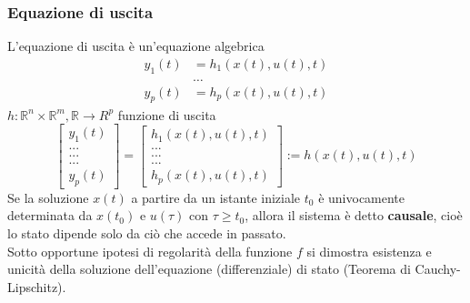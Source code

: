 \documentclass{article}
\numberwithin{equation}{subsection}
\begin{document}
\subsubsection{Equazione di uscita}
L'equazione di uscita è un'equazione algebrica
\begin{align*}
    y_1(t) &= h_1 \left(x(t), u(t), t\right)\\
    &\dots\\
    y_p (t) &= h_p \left(x(t), u(t), t\right)
\end{align*}
$h : \mathbb{R}^n \times \mathbb{R}^m , \mathbb{R} \rightarrow R^p$ funzione di uscita
\begin{equation}
    \begin{bmatrix}
        y_1(t)\\
        ...\\
        ...\\
        ...\\
        y_p(t)
    \end{bmatrix} 
    =
    \begin{bmatrix}
        h_1\left(x(t),u(t),t\right)\\
        ...\\
        ...\\
        ...\\
        h_p\left(x(t),u(t),t\right)
    \end{bmatrix}
    := h\left(x(t),u(t),t\right)
\end{equation}
\vspace*{0.2cm}
Se la soluzione $x(t)$ a partire da un istante iniziale $t_0$ è univocamente determinata da $x(t_0)$ e $u(\tau)$ con $\tau \geq t_0$, allora il sistema è detto \textbf{causale}, cioè lo stato dipende solo da ciò che accede in passato.\\
Sotto opportune ipotesi di regolarità della funzione $f$ si dimostra esistenza e unicità della soluzione dell'equazione (differenziale) di stato (Teorema di Cauchy-Lipschitz).
\end{document}
